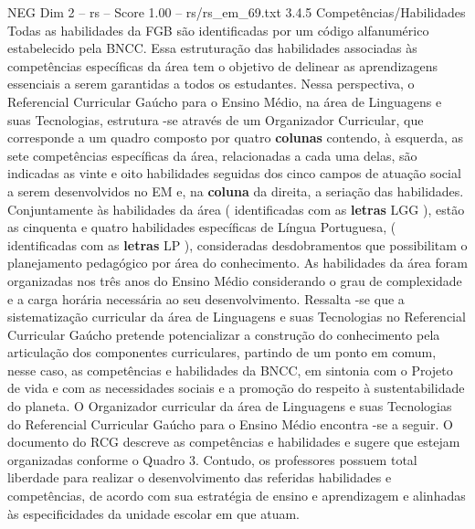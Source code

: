 \begin{textsample}{NEG Dim 2 – rs – Score 1.00 – rs/rs\_em\_69.txt}  \label{ex:f2_neg_220}
3.4.5 Competências/Habilidades Todas as habilidades da FGB são identificadas por um código alfanumérico estabelecido pela BNCC.
Essa estruturação das habilidades associadas às competências específicas da área tem o objetivo de delinear as aprendizagens essenciais a serem garantidas a todos os estudantes.
Nessa perspectiva, o Referencial Curricular Gaúcho para o Ensino Médio, na área de Linguagens e suas Tecnologias, estrutura -se através de um Organizador Curricular, que corresponde a um quadro composto por quatro \textbf{colunas} contendo, à esquerda, as sete competências específicas da área, relacionadas a cada uma delas, são indicadas as vinte e oito habilidades seguidas dos cinco campos de atuação social a serem desenvolvidos no EM e, na \textbf{coluna} da direita, a seriação das habilidades.
Conjuntamente às habilidades da área ( identificadas com as \textbf{letras} LGG ), estão as cinquenta e quatro habilidades específicas de Língua Portuguesa, ( identificadas com as \textbf{letras} LP ), consideradas desdobramentos que possibilitam o planejamento pedagógico por área do conhecimento.
As habilidades da área foram organizadas nos três anos do Ensino Médio considerando o grau de complexidade e a carga horária necessária ao seu desenvolvimento.
Ressalta -se que a sistematização curricular da área de Linguagens e suas Tecnologias no Referencial Curricular Gaúcho pretende potencializar a construção do conhecimento pela articulação dos componentes curriculares, partindo de um ponto em comum, nesse caso, as competências e habilidades da BNCC, em sintonia com o Projeto de vida e com as necessidades sociais e a promoção do respeito à sustentabilidade do planeta.
O Organizador curricular da área de Linguagens e suas Tecnologias do Referencial Curricular Gaúcho para o Ensino Médio encontra -se a seguir.
O documento do RCG descreve as competências e habilidades e sugere que estejam organizadas conforme o Quadro 3.
Contudo, os professores possuem total liberdade para realizar o desenvolvimento das referidas habilidades e competências, de acordo com sua estratégia de ensino e aprendizagem e alinhadas às especificidades da unidade escolar em que atuam.

\end{textsample}
